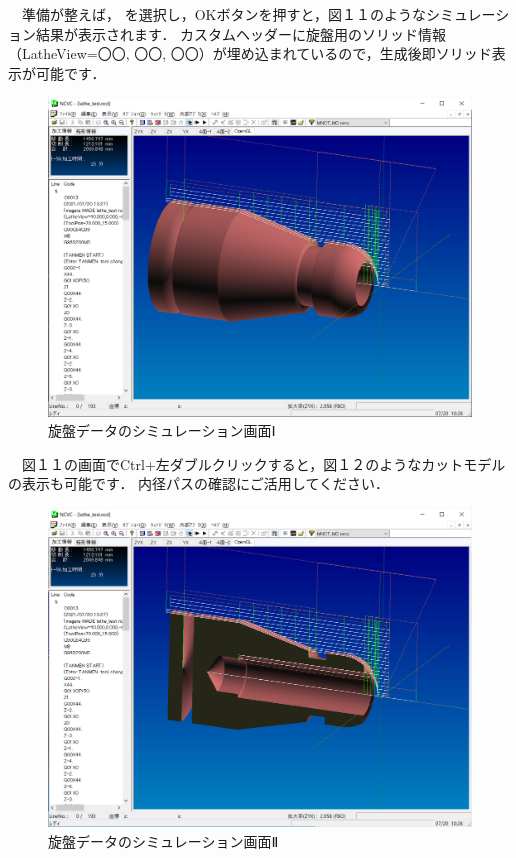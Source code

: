 

\vspace*{1zh}
　準備が整えば， を選択し，OKボタンを押すと，図１１のようなシミュレーション結果が表示されます．
カスタムヘッダーに旋盤用のソリッド情報（LatheView=〇〇, 〇〇, 〇〇）が埋め込まれているので，生成後即ソリッド表示が可能です．

\begin{figure}[H]
\centering
\includegraphics[scale=0.5]{No3/fig/simu1.png}
\caption{旋盤データのシミュレーション画面Ⅰ}
\label{fig:simu1.png}
\end{figure}

　図１１の画面でCtrl+左ダブルクリックすると，図１２のようなカットモデルの表示も可能です．
内径パスの確認にご活用してください．

\begin{figure}[H]
\centering
\includegraphics[scale=0.5]{No3/fig/simu2.png}
\caption{旋盤データのシミュレーション画面Ⅱ}
\label{fig:simu2.png}
\end{figure}

